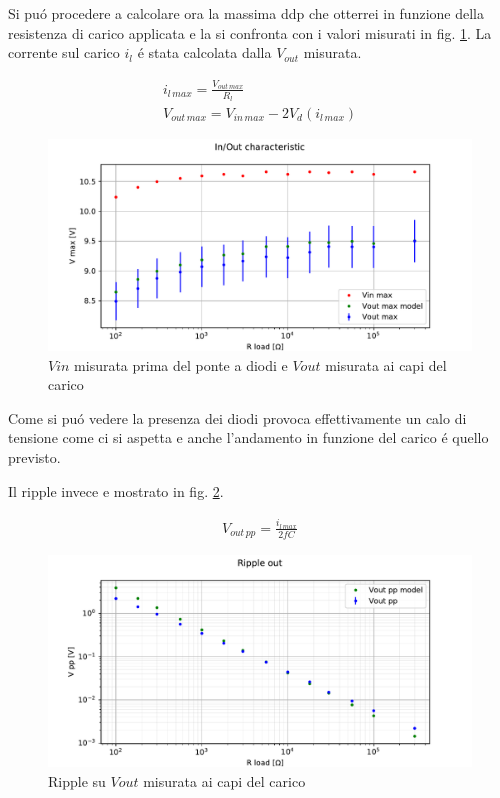 Si pu\'o procedere a calcolare ora la massima ddp che otterrei in funzione della resistenza di carico applicata e la si confronta con i valori misurati in fig. \ref{fig:vmaxcconf}. La corrente sul carico $i_l$ \'e stata calcolata dalla $V_{out}$ misurata.

\begin{gather}
	i_{l\, max} = \frac{V_{out\, max}}{R_l} \\
	V_{out\, max} = V_{in\, max} - 2 V_d(i_{l\, max}) 
\end{gather}

\begin{figure}[h]
\centering
\includegraphics[width=\textwidth]{fig1.pdf}
\caption{$Vin$ misurata prima del ponte a diodi e $Vout$ misurata ai capi del carico}
\label{fig:vmaxcconf}
\end{figure}

Come si pu\'o vedere la presenza dei diodi provoca effettivamente un calo di tensione come ci si aspetta e anche l'andamento in funzione del carico \'e quello previsto.

Il ripple invece e mostrato in fig. \ref{fig:vppcconf}.

\begin{gather}
	V_{out\, pp} = \frac{i_{l\, max}}{2 f C}
\end{gather}

\begin{figure}[h]
\centering
\includegraphics[width=\textwidth]{fig2.pdf}
\caption{Ripple su $Vout$ misurata ai capi del carico}
\label{fig:vppcconf}
\end{figure}

